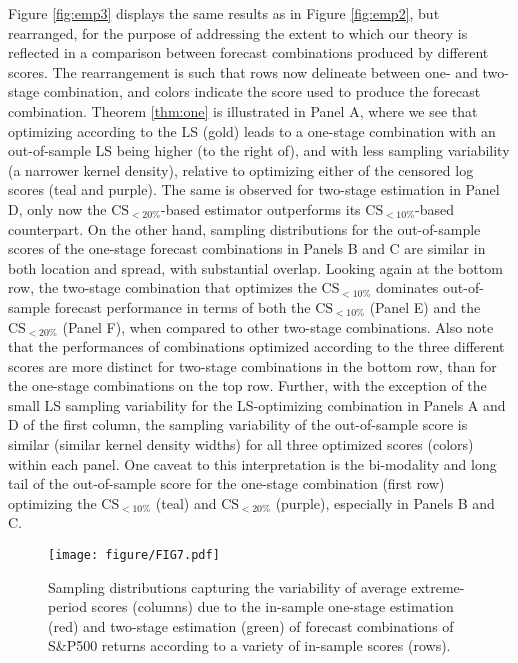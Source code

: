 \documentclass[12pt]{article}
\theoremstyle{definition}
\theoremstyle{remark}
\begin{document}
Figure \ref{fig:emp3} displays the same results as in Figure \ref{fig:emp2}, but rearranged, for the purpose of addressing the extent to which our theory is reflected in a comparison between forecast combinations produced by different scores. The rearrangement is such that rows now delineate between one- and two-stage combination, and colors indicate the score used to produce the forecast combination. Theorem \ref{thm:one} is illustrated in Panel A, where we see that optimizing according to the LS (gold) leads to a one-stage combination with an out-of-sample LS being higher (to the right of), and with less sampling variability (a narrower kernel density), relative to optimizing either of the censored log scores (teal and purple). The same is observed for two-stage estimation in Panel D, only now the $\mathrm{CS}_{<20\%}$-based estimator outperforms its $\mathrm{CS}_{<10\%}$-based counterpart. On the other hand, sampling distributions for the out-of-sample scores of the one-stage forecast combinations in Panels B and C are similar in both location and spread, with substantial overlap. Looking again at the bottom row, the two-stage combination that optimizes the $\mathrm{CS}_{<10\%}$ dominates out-of-sample forecast performance in terms of both the $\mathrm{CS}_{<10\%}$ (Panel E) and the $\mathrm{CS}_{<20\%}$ (Panel F), when compared to other two-stage combinations. Also note that the performances of combinations optimized according to the three different scores are more distinct for two-stage combinations in the bottom row, than for the one-stage combinations on the top row. Further, with the exception of the small LS sampling variability for the LS-optimizing combination in Panels A and D of the first column, the sampling variability of the out-of-sample score is similar (similar kernel density widths) for all three optimized scores (colors) within each panel. One caveat to this interpretation is the bi-modality and long tail of the out-of-sample score for the one-stage combination (first row) optimizing the $\mathrm{CS}_{<10\%} $ (teal) and $\mathrm{CS}_{<20\%}$ (purple), especially in Panels B and C.

\begin{figure}[t]
\texttt{[image: figure/FIG7.pdf]}
\caption{Sampling distributions capturing the variability of average extreme-period scores (columns) due to the in-sample one-stage estimation (red) and two-stage estimation (green) of forecast combinations of S\&P500 returns according to a variety of in-sample scores (rows).}
\label{fig:emp4}
\end{figure}
\end{document}
